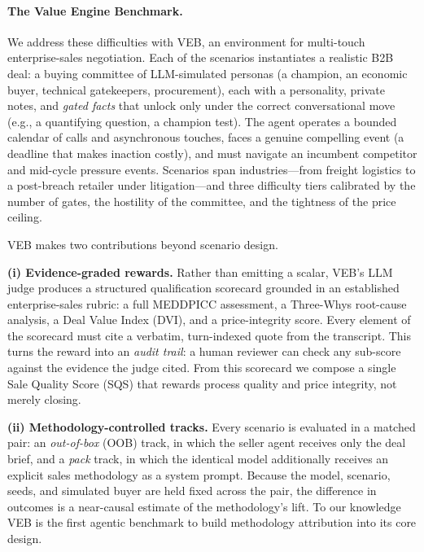 \paragraph{The Value Engine Benchmark.}
We address these difficulties with VEB, an environment for multi-touch
enterprise-sales negotiation. Each of the \numScenarios{} scenarios instantiates
a realistic B2B deal: a buying committee of LLM-simulated personas (a champion, an
economic buyer, technical gatekeepers, procurement), each with a personality,
private notes, and \emph{gated facts} that unlock only under the correct
conversational move (e.g., a quantifying question, a champion test). The agent
operates a bounded calendar of calls and asynchronous touches, faces a genuine
compelling event (a deadline that makes inaction costly), and must navigate an
incumbent competitor and mid-cycle pressure events. Scenarios span
\numIndustries{} industries---from freight logistics to a post-breach retailer
under litigation---and three difficulty tiers calibrated by the number of gates,
the hostility of the committee, and the tightness of the price ceiling.

VEB makes two contributions beyond scenario design.

\textbf{(i) Evidence-graded rewards.} Rather than emitting a scalar, VEB's LLM
judge produces a structured qualification scorecard grounded in an established
enterprise-sales rubric: a full MEDDPICC assessment, a Three-Whys root-cause
analysis, a Deal Value Index (DVI), and a price-integrity score. Every element of
the scorecard must cite a verbatim, turn-indexed quote from the transcript. This
turns the reward into an \emph{audit trail}: a human reviewer can check any
sub-score against the evidence the judge cited. From this scorecard we compose a
single Sale Quality Score (SQS) that rewards process quality and price integrity,
not merely closing.

\textbf{(ii) Methodology-controlled tracks.} Every scenario is evaluated in a
matched pair: an \emph{out-of-box} (OOB) track, in which the seller agent
receives only the deal brief, and a \emph{pack} track, in which the identical
model additionally receives an explicit sales methodology as a system prompt.
Because the model, scenario, seeds, and simulated buyer are held fixed across the
pair, the difference in outcomes is a near-causal estimate of the methodology's
lift. To our knowledge VEB is the first agentic benchmark to build methodology
attribution into its core design.

